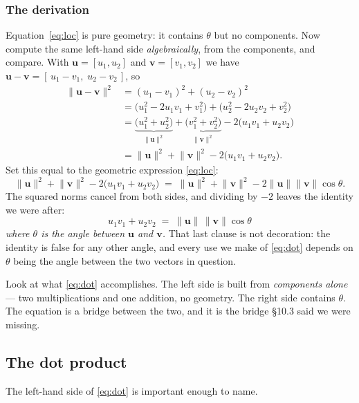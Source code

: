 \documentclass[11pt]{article}
\theoremstyle{definition}
\theoremstyle{remark}
\newcommand{\vc}[1]{\mathbf{#1}}
\newcommand{\norm}[1]{\lVert #1\rVert}
\begin{document}
\subsubsection*{The derivation}
Equation~\eqref{eq:loc} is pure geometry: it contains $\theta$ but no
components. Now compute the same left-hand side \emph{algebraically}, from the
components, and compare. With $\vc{u}=[u_1,u_2]$ and $\vc{v}=[v_1,v_2]$ we have
$\vc{u}-\vc{v}=[\,u_1-v_1,\;u_2-v_2\,]$, so
\begin{align*}
  \norm{\vc{u}-\vc{v}}^{2}
   &= (u_1-v_1)^{2}+(u_2-v_2)^{2} \\[2pt]
   &= \bigl(u_1^{2}-2u_1v_1+v_1^{2}\bigr)
      +\bigl(u_2^{2}-2u_2v_2+v_2^{2}\bigr) \\[2pt]
   &= \underbrace{\bigl(u_1^{2}+u_2^{2}\bigr)}_{\textstyle \norm{\vc{u}}^{2}}
      +\underbrace{\bigl(v_1^{2}+v_2^{2}\bigr)}_{\textstyle \norm{\vc{v}}^{2}}
      -2\bigl(u_1v_1+u_2v_2\bigr) \\[2pt]
   &= \norm{\vc{u}}^{2}+\norm{\vc{v}}^{2}-2\bigl(u_1v_1+u_2v_2\bigr).
\end{align*}
Set this equal to the geometric expression \eqref{eq:loc}:
\[
  \norm{\vc{u}}^{2}+\norm{\vc{v}}^{2}-2\bigl(u_1v_1+u_2v_2\bigr)
  \;=\;
  \norm{\vc{u}}^{2}+\norm{\vc{v}}^{2}-2\norm{\vc{u}}\norm{\vc{v}}\cos\theta .
\]
The squared norms cancel from both sides, and dividing by $-2$ leaves the
identity we were after:
\begin{equation}
  \boxed{\;u_1v_1+u_2v_2 \;=\; \norm{\vc{u}}\,\norm{\vc{v}}\cos\theta\;}
  \label{eq:dot}
\end{equation}
\emph{where $\theta$ is the angle between $\vc{u}$ and $\vc{v}$.} That last
clause is not decoration: the identity is false for any other angle, and every
use we make of \eqref{eq:dot} depends on $\theta$ being the angle between the
two vectors in question.

Look at what \eqref{eq:dot} accomplishes. The left side is built from
\emph{components alone} --- two multiplications and one addition, no geometry.
The right side contains $\theta$. The equation is a bridge between the two, and
it is the bridge \S10.3 said we were missing.

\subsection{The dot product}
The left-hand side of \eqref{eq:dot} is important enough to name.
\end{document}
